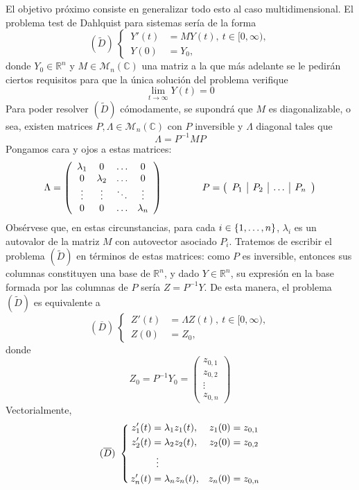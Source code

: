 \documentclass[11pt]{report}
\theoremstyle{mytheorem}
\theoremstyle{mydefinition}
\theoremstyle{myexample}
\newcommand{\R}{\mathbb R}
\newcommand{\C}{\mathbb C}
\begin{document}
El objetivo próximo consiste en generalizar todo esto al caso multidimensional. El problema test de Dahlquist para sistemas sería de la forma
\[(\widetilde{D}) \ \left\{
\begin{alignedat}{1}
\, Y'(t)  &= M Y(t), \ t \in [0,\infty), \\
\, Y(0) &= Y_0,
\end{alignedat}\right.\]
donde $Y_0 \in \R^n$ y $M \in \mathcal{M}_n(\C)$ una matriz a la que más adelante se le pedirán ciertos requisitos para que la única solución del problema verifique
\[\lim_{t \to \infty} Y(t) = 0\]
Para poder resolver $(\widetilde{D})$ cómodamente, se supondrá que $M$ es diagonalizable, o sea, existen matrices $P,\Lambda \in \mathcal{M}_n(\C)$ con $P$ inversible y $\Lambda$ diagonal tales que \[\Lambda = P^{-1}M P\] Pongamos cara y ojos a estas matrices:
\[\Lambda = \left( \begin{array}{cccc}
     \lambda_1 & 0 & \mathellipsis & 0 \\
     0 & \lambda_2 & \mathellipsis & 0 \\
     \vdots & \vdots & \ddots & \vdots \\
     0 & 0 & \mathellipsis & \lambda_n
\end{array} \right) \qquad \qquad P = \left( \begin{array}{c|c|c|c}
     P_1& P_2 & \mathellipsis & P_n  \\
\end{array} \right)\]
Obsérvese que, en estas circunstancias, para cada $i \in \{1,\mathellipsis,n\}$, $\lambda_i$ es un autovalor de la matriz $M$ con autovector asociado $P_i$. Tratemos de escribir el problema $(\widetilde{D})$ en términos de estas matrices: como $P$ es inversible, entonces sus columnas constituyen una base de $\R^n$, y dado $Y \in \R^n$, su expresión en la base formada por las columnas de $P$ sería $Z = P^{-1}Y$. De esta manera, el problema $(\widetilde{D})$ es equivalente a
\[(\overline{D}) \ \left\{
\begin{alignedat}{1}
\, Z'(t)  &= \Lambda Z(t), \ t \in [0,\infty), \\
\, Z(0) &= Z_0,
\end{alignedat}\right.\]
donde 
\[Z_0 = P^{-1}Y_0 = \left( \begin{array}{c}
z_{0,1} \\[5pt]
z_{0,2} \\[5pt]
\vdots \\[5pt]
z_{0,n}
\end{array} \right)\] 
Vectorialmente,
\[(\overline{D}) \ \left\{
\begin{alignedat}{3}
\, z_1'(t) &= \lambda_1z_1(t), \quad &z_1(0) &= z_{0,1} \\
\, z_2'(t) &= \lambda_2z_2(t), \quad &z_2(0) &= z_{0,2}\\
\mathrlap{\ \, \vdots} \\
\, z_n'(t) &= \lambda_nz_n(t), \quad &z_n(0) &= z_{0,n}
\end{alignedat}\right.\]
\end{document}
